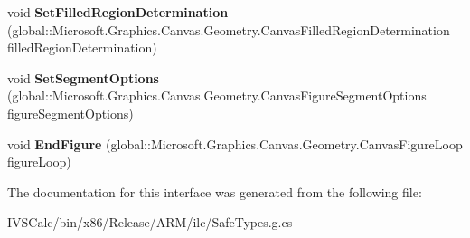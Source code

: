 \begin{DoxyCompactItemize}
\item 
\mbox{\label{interface_microsoft_1_1_graphics_1_1_canvas_1_1_geometry_1_1_i_canvas_path_receiver_a0bcd3e4a427ddf33e3454ce466e35bec}} 
void {\bfseries Set\+Filled\+Region\+Determination} (global\+::\+Microsoft.\+Graphics.\+Canvas.\+Geometry.\+Canvas\+Filled\+Region\+Determination filled\+Region\+Determination)
\item 
\mbox{\label{interface_microsoft_1_1_graphics_1_1_canvas_1_1_geometry_1_1_i_canvas_path_receiver_a5492b54121b4ffc412071f8844a3b6aa}} 
void {\bfseries Set\+Segment\+Options} (global\+::\+Microsoft.\+Graphics.\+Canvas.\+Geometry.\+Canvas\+Figure\+Segment\+Options figure\+Segment\+Options)
\item 
\mbox{\label{interface_microsoft_1_1_graphics_1_1_canvas_1_1_geometry_1_1_i_canvas_path_receiver_acad2c777502ab1ccf0c33ff63873a7c9}} 
void {\bfseries End\+Figure} (global\+::\+Microsoft.\+Graphics.\+Canvas.\+Geometry.\+Canvas\+Figure\+Loop figure\+Loop)
\end{DoxyCompactItemize}


The documentation for this interface was generated from the following file\+:\begin{DoxyCompactItemize}
\item 
I\+V\+S\+Calc/bin/x86/\+Release/\+A\+R\+M/ilc/Safe\+Types.\+g.\+cs\end{DoxyCompactItemize}
